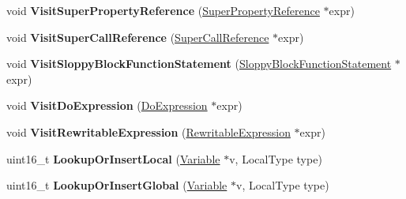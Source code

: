 \begin{DoxyCompactItemize}
\item 
void {\bfseries Visit\+Super\+Property\+Reference} (\hyperlink{classv8_1_1internal_1_1_super_property_reference}{Super\+Property\+Reference} $\ast$expr)\hypertarget{classv8_1_1internal_1_1wasm_1_1_asm_wasm_builder_impl_ae7e1390be1807b6b1def78762529ccce}{}\label{classv8_1_1internal_1_1wasm_1_1_asm_wasm_builder_impl_ae7e1390be1807b6b1def78762529ccce}

\item 
void {\bfseries Visit\+Super\+Call\+Reference} (\hyperlink{classv8_1_1internal_1_1_super_call_reference}{Super\+Call\+Reference} $\ast$expr)\hypertarget{classv8_1_1internal_1_1wasm_1_1_asm_wasm_builder_impl_a19483d009b120ea100ad586cf6e0c9dd}{}\label{classv8_1_1internal_1_1wasm_1_1_asm_wasm_builder_impl_a19483d009b120ea100ad586cf6e0c9dd}

\item 
void {\bfseries Visit\+Sloppy\+Block\+Function\+Statement} (\hyperlink{classv8_1_1internal_1_1_sloppy_block_function_statement}{Sloppy\+Block\+Function\+Statement} $\ast$expr)\hypertarget{classv8_1_1internal_1_1wasm_1_1_asm_wasm_builder_impl_a913c4511ed572489587a97e3f67b3f81}{}\label{classv8_1_1internal_1_1wasm_1_1_asm_wasm_builder_impl_a913c4511ed572489587a97e3f67b3f81}

\item 
void {\bfseries Visit\+Do\+Expression} (\hyperlink{classv8_1_1internal_1_1_do_expression}{Do\+Expression} $\ast$expr)\hypertarget{classv8_1_1internal_1_1wasm_1_1_asm_wasm_builder_impl_a96d35491f163571b7527a6ca0288615f}{}\label{classv8_1_1internal_1_1wasm_1_1_asm_wasm_builder_impl_a96d35491f163571b7527a6ca0288615f}

\item 
void {\bfseries Visit\+Rewritable\+Expression} (\hyperlink{classv8_1_1internal_1_1_rewritable_expression}{Rewritable\+Expression} $\ast$expr)\hypertarget{classv8_1_1internal_1_1wasm_1_1_asm_wasm_builder_impl_a5ecc52b74cf0ce6d54629f159148dda3}{}\label{classv8_1_1internal_1_1wasm_1_1_asm_wasm_builder_impl_a5ecc52b74cf0ce6d54629f159148dda3}

\item 
uint16\+\_\+t {\bfseries Lookup\+Or\+Insert\+Local} (\hyperlink{classv8_1_1internal_1_1_variable}{Variable} $\ast$v, Local\+Type type)\hypertarget{classv8_1_1internal_1_1wasm_1_1_asm_wasm_builder_impl_a1638f0a872136ce4098ea860f075fd47}{}\label{classv8_1_1internal_1_1wasm_1_1_asm_wasm_builder_impl_a1638f0a872136ce4098ea860f075fd47}

\item 
uint16\+\_\+t {\bfseries Lookup\+Or\+Insert\+Global} (\hyperlink{classv8_1_1internal_1_1_variable}{Variable} $\ast$v, Local\+Type type)\hypertarget{classv8_1_1internal_1_1wasm_1_1_asm_wasm_builder_impl_a8b557b093918a270f9abb27fa92108b3}{}\label{classv8_1_1internal_1_1wasm_1_1_asm_wasm_builder_impl_a8b557b093918a270f9abb27fa92108b3}


\end{DoxyCompactItemize}
